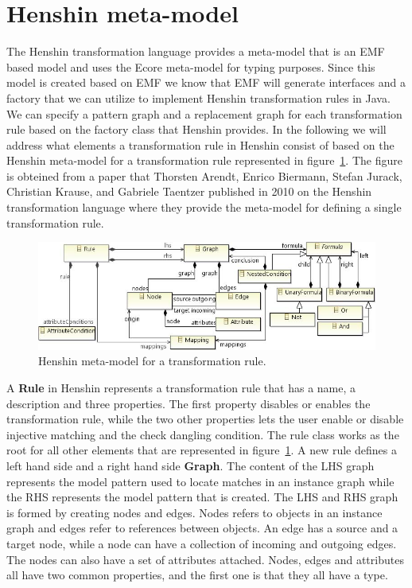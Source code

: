 \section{Henshin meta-model}
\label{sec:henshin_meta}

The Henshin transformation language provides a meta-model that is an EMF based
model and uses the Ecore meta-model for typing purposes\cite{Arendt2010}. Since
this model is created based on EMF we know that EMF will generate interfaces and
a factory that we can utilize to implement Henshin transformation rules in Java.
We can specify a pattern graph and a replacement graph for each transformation
rule based on the factory class that Henshin provides. In the following we
will address what elements a transformation rule in Henshin consist of based on
the Henshin meta-model for a transformation rule represented in
figure~\ref{fig:Henshin_metamodel}. The figure is obteined from a paper that
Thorsten Arendt, Enrico Biermann, Stefan Jurack, Christian Krause, and Gabriele
Taentzer published in 2010 on the Henshin transformation language where they
provide the meta-model for defining a single transformation
rule\cite{Arendt2010}.

\begin{figure}[H]
	\centering
	\includegraphics[scale=0.8]{./Figures/Henshin_metamodel.png}
	\caption[Henshin meta-model for a transformation rule]
	{Henshin meta-model for a transformation rule.}
	\label{fig:Henshin_metamodel}
\end{figure}

A \textbf{Rule} in Henshin represents a transformation rule that has a name,
a description and three properties. The first property disables or enables the
transformation rule, while the two other properties lets the user enable or
disable injective matching and the check dangling condition. The rule class
works as the root for all other elements that are represented in 
figure~\ref{fig:Henshin_metamodel}. A new rule defines a left hand side and a
right hand side \textbf{Graph}. The content of the LHS graph represents the
model pattern used to locate matches in an instance graph while the RHS
represents the model pattern that is created. The LHS and RHS graph is formed by
creating nodes and edges. Nodes refers to objects in an instance graph and
edges refer to references between objects. An edge has a source and a target
node, while a node can have a collection of incoming and outgoing edges. The
nodes can also have a set of attributes attached. Nodes, edges and attributes
all have two common properties, and the first one is that they all have a type.

